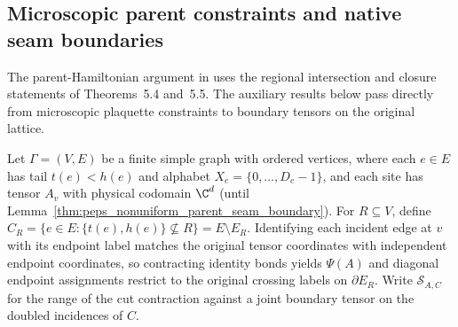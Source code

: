 \subsection{Microscopic parent constraints and native seam boundaries}
\label{sec:peps_native_parent_seam_cuts}

The parent-Hamiltonian argument in \cite{Schuch2010PEPS} uses the regional
intersection and closure statements of Theorems~5.4 and~5.5. The auxiliary
results below pass directly from microscopic plaquette constraints to
boundary tensors on the original lattice.

\begin{definition}%
    \label{def:peps_native_regional_cut}
    \leanok
    Let $\Gamma=(V,E)$ be a finite simple graph with ordered vertices, where
    each $e\in E$ has tail $t(e)<h(e)$ and alphabet $X_e=\{0,\ldots,D_e-1\}$,
    and each site has tensor $A_v$ with physical codomain $\C^d$ (until
    Lemma~\ref{thm:peps_nonuniform_parent_seam_boundary}). For $R\subseteq V$,
    define $C_R=\{e\in E:\{t(e),h(e)\}\not\subseteq R\}=E\setminus E_R$.
    Identifying each incident edge at $v$ with its endpoint label matches the
    original tensor coordinates with independent endpoint coordinates, so
    contracting identity bonds yields $\Psi(A)$ and diagonal endpoint
    assignments restrict to the original crossing labels on $\partial E_R$.
    Write $\mathcal S_{A,C}$ for the range of the cut contraction against a
    joint boundary tensor on the doubled incidences of $C$.
\end{definition}

